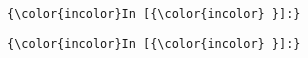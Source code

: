 \documentclass[11pt]{article}
\begin{document}
    \begin{center}
    \end{center}
    { \hspace*{\fill} \\}
    

    \begin{Verbatim}[commandchars=\\\{\}]
{\color{incolor}In [{\color{incolor} }]:} 
\end{Verbatim}

    \begin{Verbatim}[commandchars=\\\{\}]
{\color{incolor}In [{\color{incolor} }]:} 
\end{Verbatim}


    
    
    
    
\end{document}
